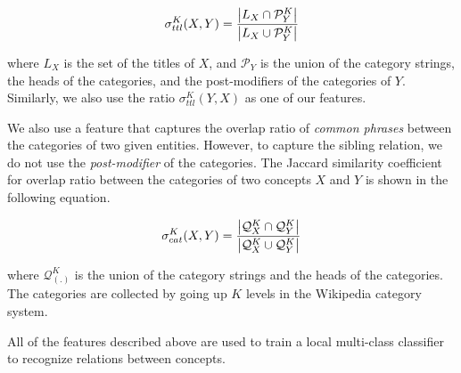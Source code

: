 \begin{equation}
  \label{eq:3}
  \sigma_{ttl}^K(X,Y) = \frac{\left| L_X \cap \mathcal{P}_Y^K \right|}{\left| L_X \cup \mathcal{P}_Y^K \right|} \notag
\end{equation}

where $L_X$ is the set of the titles of $X$, and $\mathcal{P}_Y$ is
the union of the category strings, the heads of the categories, and
the post-modifiers of the categories of $Y$. Similarly, we also use
the ratio $\sigma_{ttl}^K(Y,X)$ as one of our features.

We also use a feature that captures the overlap ratio of {\em common
  phrases} between the categories of two given entities. However, to
capture the sibling relation, we do not use the {\em post-modifier} of
the categories. The Jaccard similarity coefficient for overlap ratio
between the categories of two concepts $X$ and $Y$ is shown in the
following equation.

\begin{equation}
  \label{eq:4}
  \sigma_{cat}^K(X,Y) = \frac{\left| \mathcal{Q}_X^K \cap \mathcal{Q}_Y^K \right|}{\left| \mathcal{Q}_X^K \cup \mathcal{Q}_Y^K \right|} \notag
\end{equation}

where $\mathcal{Q}_{(.)}^K$ is the union of the category strings and
the heads of the categories. The categories are collected by going up
$K$ levels in the Wikipedia category system.

All of the features described above are used to train a local
multi-class classifier to recognize relations between concepts.

